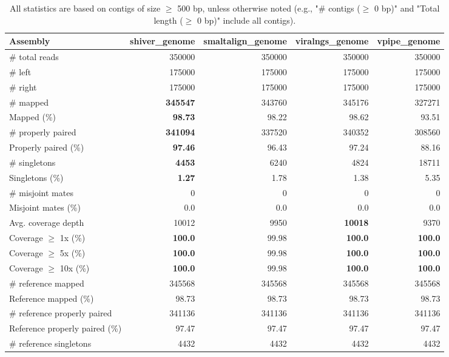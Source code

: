 \documentclass[12pt,a4paper]{article}
\begin{document}
\begin{table}[ht]
\begin{center}
\caption{All statistics are based on contigs of size $\geq$ 500 bp, unless otherwise noted (e.g., "\# contigs ($\geq$ 0 bp)" and "Total length ($\geq$ 0 bp)" include all contigs).}
\begin{tabular}{|l*{4}{|r}|}
\hline
Assembly & shiver\_genome & smaltalign\_genome & viralngs\_genome & vpipe\_genome \\ \hline
\# total reads & 350000 & 350000 & 350000 & 350000 \\ \hline
\# left & 175000 & 175000 & 175000 & 175000 \\ \hline
\# right & 175000 & 175000 & 175000 & 175000 \\ \hline
\# mapped & {\bf 345547} & 343760 & 345176 & 327271 \\ \hline
Mapped (\%) & {\bf 98.73} & 98.22 & 98.62 & 93.51 \\ \hline
\# properly paired & {\bf 341094} & 337520 & 340352 & 308560 \\ \hline
Properly paired (\%) & {\bf 97.46} & 96.43 & 97.24 & 88.16 \\ \hline
\# singletons & {\bf 4453} & 6240 & 4824 & 18711 \\ \hline
Singletons (\%) & {\bf 1.27} & 1.78 & 1.38 & 5.35 \\ \hline
\# misjoint mates & 0 & 0 & 0 & 0 \\ \hline
Misjoint mates (\%) & 0.0 & 0.0 & 0.0 & 0.0 \\ \hline
Avg. coverage depth & 10012 & 9950 & {\bf 10018} & 9370 \\ \hline
Coverage $\geq$ 1x (\%) & {\bf 100.0} & 99.98 & {\bf 100.0} & {\bf 100.0} \\ \hline
Coverage $\geq$ 5x (\%) & {\bf 100.0} & 99.98 & {\bf 100.0} & {\bf 100.0} \\ \hline
Coverage $\geq$ 10x (\%) & {\bf 100.0} & 99.98 & {\bf 100.0} & {\bf 100.0} \\ \hline
\# reference mapped & 345568 & 345568 & 345568 & 345568 \\ \hline
Reference mapped (\%) & 98.73 & 98.73 & 98.73 & 98.73 \\ \hline
\# reference properly paired & 341136 & 341136 & 341136 & 341136 \\ \hline
Reference properly paired (\%) & 97.47 & 97.47 & 97.47 & 97.47 \\ \hline
\# reference singletons & 4432 & 4432 & 4432 & 4432 \\ \hline

\end{tabular}
\end{center}
\end{table}
\end{document}
